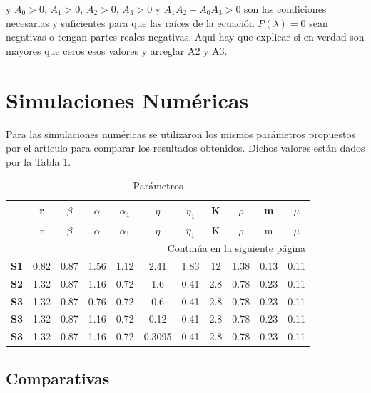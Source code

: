\documentclass{wscpaperproc}
\theoremstyle{wsc}
\begin{document}
y $A_0 > 0$, $A_1 > 0$, $A_2 > 0$, $A_3 > 0$ y $A_1 A_2 - A_0 A_3 > 0$ son las condiciones necesarias y suficientes
para que las raíces de la ecuación $P(\lambda) = 0$ sean negativas o tengan partes reales negativas. Aqui hay que explicar si en verdad
son mayores que ceros esos valores y arreglar A2 y A3.

\section{Simulaciones Numéricas}
Para las simulaciones numéricas se utilizaron los mismos parámetros propuestos por el artículo para comparar los resultados obtenidos.
Dichos valores están dados por la Tabla \ref{tab:first}.


\begin{longtable}{rcccccccccc}
	\caption{Par\'ametros\label{tab:first}}                                                                \\
	\hline
	            & r    & $\beta$ & $\alpha$ & $\alpha_1$ & $\eta$ & $\eta_1$ & K   & $\rho$ & m    & $\mu$ \\ \hline
	\endfirsthead
	\hline
	            & r    & $\beta$ & $\alpha$ & $\alpha_1$ & $\eta$ & $\eta_1$ & K   & $\rho$ & m    & $\mu$ \\ \hline
	\endhead
	\hline
	\multicolumn{11}{|r|}{{Continúa en la siguiente página}}                                               \\ \hline
	\endfoot
	\hline
	\endlastfoot
	\textbf{S1} & 0.82 & 0.87    & 1.56     & 1.12       & 2.41   & 1.83     & 12  & 1.38   & 0.13 & 0.11  \\
	\textbf{S2} & 1.32 & 0.87    & 1.16     & 0.72       & 1.6    & 0.41     & 2.8 & 0.78   & 0.23 & 0.11  \\
	\textbf{S3} & 1.32 & 0.87    & 0.76     & 0.72       & 0.6    & 0.41     & 2.8 & 0.78   & 0.23 & 0.11  \\
	\textbf{S3} & 1.32 & 0.87    & 1.16     & 0.72       & 0.12   & 0.41     & 2.8 & 0.78   & 0.23 & 0.11  \\
	\textbf{S3} & 1.32 & 0.87    & 1.16     & 0.72       & 0.3095 & 0.41     & 2.8 & 0.78   & 0.23 & 0.11  \\
\end{longtable}

\subsection{Comparativas}
\end{document}
